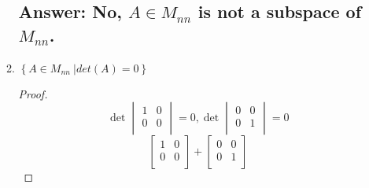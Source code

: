 \documentclass[12pt]{article}
\newcommand{\DS} [1] {${\displaystyle #1}$}
\begin{document}
\begin{enumerate}
\begin{enumerate}
                      \subsection{Answer: No, $A \in M_{nn}$ is not a subspace of $M_{nn}$.}
                      \item \DS{ \left\{A\in{M_{nn}} \ | det (A) = 0 \right\}}
                            \begin{proof}
                                    \begin{equation*}
                                            \det
                                            \begin{vmatrix}
                                                    {1} & {0} \\
                                                    {0} & {0} \\
                                            \end{vmatrix}
                                            {= 0},
                                            \det
                                            \begin{vmatrix}
                                                    {0} & {0} \\
                                                    {0} & {1} \\
                                            \end{vmatrix}
                                            = 0
                                    \end{equation*}
                                    \begin{equation*}
                                            \begin{bmatrix}
                                                    {1} & {0} \\
                                                    {0} & {0} \\
                                            \end{bmatrix}
                                            +
                                            \begin{bmatrix}
                                                    {0} & {0} \\
                                                    {0} & {1} \\
                                            \end{bmatrix}

\end{equation*}
\end{proof}
\end{enumerate}
\end{enumerate}
\end{document}
